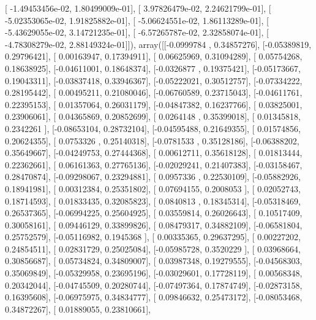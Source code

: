 \documentclass{article}
\begin{document}
       [ -1.49453456e-02,   1.80499009e-01],
       [  3.97826479e-02,   2.24621799e-01],
       [ -5.02353065e-02,   1.91825882e-01],
       [ -5.06624551e-02,   1.86113289e-01],
       [ -5.43629055e-02,   3.14721235e-01],
       [ -6.57265787e-02,   2.32858074e-01],
       [ -4.78308279e-02,   2.88149324e-01]]), array([[-0.0999784 ,  0.34857276],
       [-0.05389819,  0.29796421],
       [ 0.00163947,  0.17394911],
       [ 0.06625969,  0.31094289],
       [ 0.05754268,  0.18638925],
       [-0.04611001,  0.18648374],
       [-0.0326877 ,  0.19375421],
       [-0.05173667,  0.19043311],
       [-0.03837418,  0.33946367],
       [-0.05222021,  0.30512757],
       [-0.07334222,  0.28195442],
       [ 0.00495211,  0.21080046],
       [-0.06760589,  0.23715043],
       [-0.04611761,  0.22395153],
       [ 0.01357064,  0.26031179],
       [-0.04847382,  0.16237766],
       [ 0.03825001,  0.23906061],
       [ 0.04365869,  0.20852699],
       [ 0.0264148 ,  0.35399018],
       [ 0.01345818,  0.2342261 ],
       [-0.08653104,  0.28732104],
       [-0.04595488,  0.21649355],
       [ 0.01574856,  0.20624355],
       [ 0.0753326 ,  0.25140318],
       [-0.0781533 ,  0.35128186],
       [-0.06388202,  0.35649667],
       [-0.04249753,  0.27444368],
       [ 0.00612711,  0.35618128],
       [ 0.01813444,  0.22362661],
       [ 0.06161363,  0.27765136],
       [-0.02029241,  0.21407383],
       [-0.03158467,  0.28470874],
       [-0.09298067,  0.23294881],
       [ 0.0957336 ,  0.22530109],
       [-0.05882926,  0.18941981],
       [ 0.00312384,  0.25351802],
       [ 0.07694155,  0.2008053 ],
       [ 0.02052743,  0.18714593],
       [ 0.01833435,  0.32085823],
       [ 0.0840813 ,  0.18345314],
       [-0.05318469,  0.26537365],
       [-0.06994225,  0.25604925],
       [ 0.03559814,  0.26026643],
       [ 0.10517409,  0.30058161],
       [ 0.09446129,  0.33899826],
       [ 0.08479317,  0.34882109],
       [-0.06581804,  0.25752579],
       [-0.05116982,  0.1945368 ],
       [ 0.00335365,  0.29637295],
       [ 0.00227202,  0.24854511],
       [ 0.02831729,  0.25025084],
       [-0.05985728,  0.3520229 ],
       [ 0.03968664,  0.30856687],
       [ 0.05734824,  0.34809007],
       [ 0.03987348,  0.19279555],
       [-0.04568303,  0.35069849],
       [-0.05329958,  0.23695196],
       [-0.03029601,  0.17728119],
       [ 0.00568348,  0.20342044],
       [-0.04745509,  0.20280744],
       [-0.07497364,  0.17874749],
       [-0.02873158,  0.16395608],
       [-0.06975975,  0.34834777],
       [ 0.09846632,  0.25473172],
       [-0.08053468,  0.34872267],
       [ 0.01889055,  0.23810661],
\end{document}
